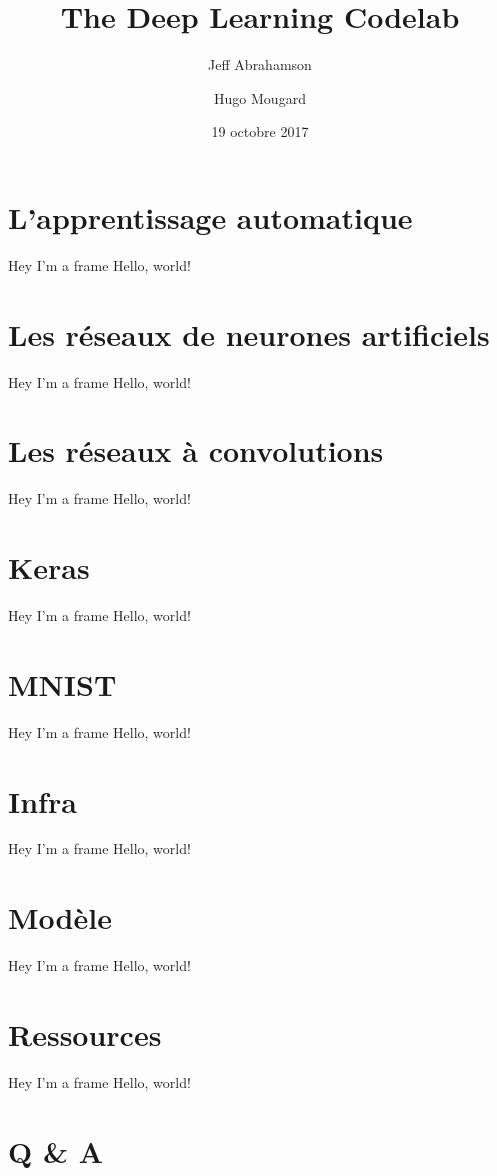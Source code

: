 \documentclass{beamer}
\title{The Deep Learning Codelab}
\date{19 octobre 2017}
\author{Jeff Abrahamson \and Hugo Mougard}
\institute{DevFest Nantes 2017}
\begin{document}
\maketitle

\section{L'apprentissage automatique}
\label{sec:ml}
\begin{frame}{Hey I'm a frame}
  Hello, world!
\end{frame}

\section{Les réseaux de neurones artificiels}
\label{sec:nn}
\begin{frame}{Hey I'm a frame}
  Hello, world!
\end{frame}

\section{Les réseaux à convolutions}
\label{sec:convnets}
\begin{frame}{Hey I'm a frame}
  Hello, world!
\end{frame}

\section{Keras}
\label{sec:keras}
\begin{frame}{Hey I'm a frame}
  Hello, world!
\end{frame}

\section{MNIST}
\label{sec:mnist}
\begin{frame}{Hey I'm a frame}
  Hello, world!
\end{frame}

\section{Infra}
\label{sec:infra}
\begin{frame}{Hey I'm a frame}
  Hello, world!
\end{frame}

\section{Modèle}
\label{sec:model}
\begin{frame}{Hey I'm a frame}
  Hello, world!
\end{frame}

\section{Ressources}
\label{sec:resources}
\begin{frame}{Hey I'm a frame}
  Hello, world!
\end{frame}

\section{Q \& A}
\label{sec:qa}
\end{document}
